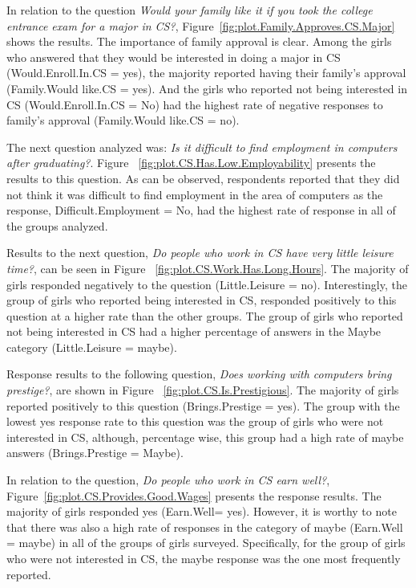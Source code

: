 In relation to the question \textit{Would your family like it if you took the college entrance exam for a major in CS?}, Figure~\ref{fig:plot.Family.Approves.CS.Major} shows the results. The importance of family approval is clear. Among the girls who answered that they would be interested in doing a major in CS (Would.Enroll.In.CS = yes), the majority reported having their family's approval (Family.Would like.CS = yes). And the girls who reported not being interested in CS  (Would.Enroll.In.CS = No) had the highest rate of  negative responses to family's approval (Family.Would like.CS = no).

The next question analyzed was: \textit{Is it difficult to find employment in computers after graduating?}. Figure ~\ref{fig:plot.CS.Has.Low.Employability} presents the results to this question. As can be observed, respondents reported that they did not think it was difficult to find employment in the area of computers as the response, Difficult.Employment = No, had the highest rate of response in all of the groups analyzed.

Results to the next question, \textit{Do people who work in CS have very little leisure time?}, can be seen in Figure ~\ref{fig:plot.CS.Work.Has.Long.Hours}. The majority of girls responded negatively to the question (Little.Leisure = no). Interestingly, the group of girls who reported being interested in CS, responded positively to this question at a higher rate than the other groups. The group of girls who reported not being interested in CS had a higher percentage of answers in the Maybe category (Little.Leisure = maybe).

Response results to the following question, \textit{Does working with computers bring prestige?},  are shown in Figure ~\ref{fig:plot.CS.Is.Prestigious}. The majority of girls reported positively to this question (Brings.Prestige = yes). The group with the lowest yes response rate to this question was the group of girls who were not interested in CS, although, percentage wise, this group had a high rate of maybe answers (Brings.Prestige = Maybe).

In relation to the question, \textit{Do people who work in CS earn well?}, Figure~\ref{fig:plot.CS.Provides.Good.Wages} presents the response results. The majority of girls responded yes (Earn.Well= yes). However, it is worthy to note that there was also a high rate of responses in the category of maybe (Earn.Well = maybe) in all of the groups of girls surveyed. Specifically, for the group of girls who were not interested in CS, the maybe response was the one most frequently reported.

